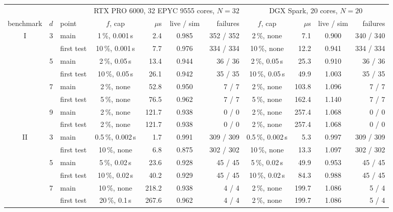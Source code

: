 \begin{tabular}{@{}cclcrcrcrcr@{}}
\toprule
& & & \multicolumn{4}{c}{RTX PRO 6000, 32 EPYC 9555 cores, $N=32$} & \multicolumn{4}{c}{DGX Spark, 20 cores, $N=20$} \\
\cmidrule(lr){4-7}\cmidrule(lr){8-11}
benchmark & $d$ & point & $f$, cap & $\mu$s & live / sim & failures & $f$, cap & $\mu$s & live / sim & failures \\
\midrule
I & 3 & main & 1\,\%, 0.001\,s & 2.4 & 0.985 & 352 / 352 & 2\,\%, none & 7.1 & 0.900 & 340 / 340 \\
 &  & first test & 10\,\%, 0.001\,s & 7.7 & 0.976 & 334 / 334 & 10\,\%, none & 12.2 & 0.941 & 334 / 334 \\
 & 5 & main & 2\,\%, 0.05\,s & 13.4 & 0.944 & 36 / 36 & 2\,\%, 0.05\,s & 25.3 & 0.910 & 36 / 36 \\
 &  & first test & 10\,\%, 0.05\,s & 26.1 & 0.942 & 35 / 35 & 10\,\%, 0.05\,s & 49.9 & 1.003 & 35 / 35 \\
 & 7 & main & 2\,\%, none & 52.8 & 0.950 & 7 / 7 & 2\,\%, none & 103.8 & 1.096 & 7 / 7 \\
 &  & first test & 5\,\%, none & 76.5 & 0.962 & 7 / 7 & 5\,\%, none & 162.4 & 1.140 & 7 / 7 \\
 & 9 & main & 2\,\%, none & 121.7 & 0.938 & 0 / 0 & 2\,\%, none & 257.4 & 1.068 & 0 / 0 \\
 &  & first test & 2\,\%, none & 121.7 & 0.938 & 0 / 0 & 2\,\%, none & 257.4 & 1.068 & 0 / 0 \\
\midrule
II & 3 & main & 0.5\,\%, 0.002\,s & 1.7 & 0.991 & 309 / 309 & 0.5\,\%, 0.002\,s & 5.3 & 0.997 & 309 / 309 \\
 &  & first test & 10\,\%, none & 6.8 & 0.875 & 302 / 302 & 10\,\%, none & 13.3 & 1.097 & 302 / 302 \\
 & 5 & main & 5\,\%, 0.02\,s & 23.6 & 0.928 & 45 / 45 & 5\,\%, 0.02\,s & 49.9 & 0.953 & 45 / 45 \\
 &  & first test & 10\,\%, 0.02\,s & 40.2 & 0.929 & 45 / 45 & 10\,\%, 0.02\,s & 84.3 & 0.988 & 45 / 45 \\
 & 7 & main & 10\,\%, none & 218.2 & 0.938 & 4 / 4 & 2\,\%, none & 199.7 & 1.086 & 5 / 4 \\
 &  & first test & 20\,\%, 0.1\,s & 267.6 & 0.962 & 4 / 4 & 2\,\%, none & 199.7 & 1.086 & 5 / 4 \\
\bottomrule
\end{tabular}
